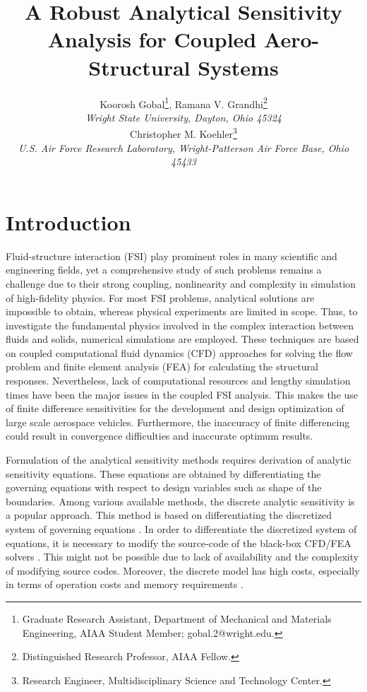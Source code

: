 \documentclass[12pt]{aiaa-pretty}
\author[Gobal, Kohler, and Grandhi]{ %
Koorosh Gobal\thanks{Graduate Research Assistant, Department of Mechanical and Materials Engineering, AIAA Student Member; gobal.2@wright.edu.},
Ramana V. Grandhi\thanks{Distinguished Research Professor, AIAA Fellow.}\\
\textit{Wright State University, Dayton, Ohio 45324}
\\
Christopher M. Koehler\thanks{Research Engineer, Multidisciplinary Science and Technology Center.}\\
\textit{U.S. Air Force Research Laboratory, Wright-Patterson Air Force Base, Ohio 45433}}
\title{A Robust Analytical Sensitivity Analysis for Coupled Aero-Structural Systems}
\begin{document}
\maketitle
\section{Introduction}
Fluid-structure interaction (FSI) play prominent roles in many scientific and engineering fields, yet a comprehensive study of such problems remains a challenge due to their strong coupling, nonlinearity and complexity in simulation of high-fidelity physics. For most FSI problems, analytical solutions are impossible to obtain, whereas physical experiments are limited in scope. Thus, to investigate the fundamental physics involved in the complex interaction between fluids and solids, numerical simulations are employed. These techniques are based on coupled computational fluid dynamics (CFD) approaches for solving the flow problem and finite element analysis (FEA) for calculating the structural responses. Nevertheless, lack of computational resources and lengthy simulation times have been the major issues in the coupled FSI analysis. This makes the use of finite difference sensitivities for the development and design optimization of large scale aerospace vehicles. Furthermore, the inaccuracy of finite differencing could result in convergence difficulties and inaccurate optimum results.

Formulation of the analytical sensitivity methods requires derivation of analytic sensitivity equations. These equations are obtained by differentiating the governing equations with respect to design variables such as shape of the boundaries. Among various available methods, the discrete analytic sensitivity is a popular approach. This method is based on differentiating the discretized system of governing equations \cite{martins2013review}. In order to differentiate the discretized system of equations, it is necessary to modify the source-code of the black-box CFD/FEA solvers \cite{cross2014local}. This might not be possible due to lack of availability and the complexity of modifying source codes. Moreover, the discrete model has high costs, especially in terms of operation costs and memory requirements \cite{peter2010numerical}.
\end{document}
